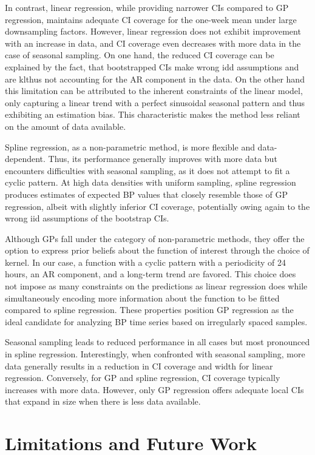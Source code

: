In contrast, linear regression, while providing narrower CIs compared to GP regression,
maintains adequate CI coverage for the one-week mean under large downsampling factors.
However, linear regression does not exhibit improvement with an increase in data,
and CI coverage even decreases with more data in the case of seasonal sampling.
On one hand, the reduced CI coverage can be explained
by the fact, that bootstrapped CIs make wrong idd assumptions and are
klthus not accounting
for the AR component in the data.
On the other hand this limitation can be attributed to the inherent constraints of the linear model,
only capturing a linear trend with a perfect sinusoidal seasonal pattern and thus
exhibiting an estimation bias.
This characteristic makes the method less reliant on the amount of data available.

Spline regression, as a non-parametric method, is more flexible and data-dependent.
Thus, its performance generally improves with more data but encounters
difficulties with seasonal sampling, as it does not attempt to fit a cyclic pattern.
At high data densities with uniform sampling, spline regression produces estimates
of expected BP values that closely resemble those of GP regression,
albeit with slightly inferior CI coverage, potentially owing again to the
wrong iid assumptions of the bootstrap CIs.

Although GPs fall under the category of non-parametric methods, they offer the option to express
prior beliefs about the function of interest through the choice of kernel.
In our case, a function with a cyclic pattern with a periodicity of 24 hours,
an AR component, and a long-term trend are favored.
This choice does not impose as many constraints on the predictions as linear regression does
while simultaneously encoding more information about the function
to be fitted compared to spline regression.
These properties position GP regression as the ideal candidate for analyzing
BP time series based on irregularly spaced samples.


Seasonal sampling leads to reduced performance in all
cases but most pronounced in spline regression.
Interestingly, when confronted with seasonal sampling, more data generally
results in a reduction in CI coverage and width for linear regression.
Conversely, for GP and spline regression, CI coverage typically increases
with more data.
However, only GP regression offers adequate local CIs that expand in size
when there is less data available.

\section{Limitations and Future Work}

